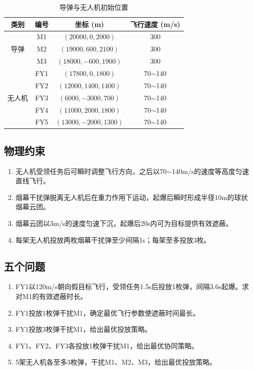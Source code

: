 \documentclass[12pt,a4paper]{ctexart}
\begin{document}
\begin{table}[H]
\centering
\caption{导弹与无人机初始位置}
\label{tab:initial_positions}
\begin{tabular}{c|c|c|c}
\toprule
\textbf{类别} & \textbf{编号} & \textbf{坐标 (m)} & \textbf{飞行速度 (m/s)} \\
\midrule
\multirow{3}{*}{导弹} & M1 & $(20000, 0, 2000)$ & 300 \\
& M2 & $(19000, 600, 2100)$ & 300 \\
& M3 & $(18000, -600, 1900)$ & 300 \\
\midrule
\multirow{5}{*}{无人机} & FY1 & $(17800, 0, 1800)$ & 70$\sim$140 \\
& FY2 & $(12000, 1400, 1400)$ & 70$\sim$140 \\
& FY3 & $(6000, -3000, 700)$ & 70$\sim$140 \\
& FY4 & $(11000, 2000, 1800)$ & 70$\sim$140 \\
& FY5 & $(13000, -2000, 1300)$ & 70$\sim$140 \\
\bottomrule
\end{tabular}
\end{table}

\subsection{物理约束}
\begin{enumerate}[label=(\arabic*)]
    \item 无人机受领任务后可瞬时调整飞行方向，之后以70$\sim$140m/s的速度等高度匀速直线飞行。
    \item 烟幕干扰弹脱离无人机后在重力作用下运动，起爆后瞬时形成半径10m的球状烟幕云团。
    \item 烟幕云团以3m/s的速度匀速下沉，起爆后20s内可为目标提供有效遮蔽。
    \item 每架无人机投放两枚烟幕干扰弹至少间隔1s；每架至多投放3枚。
\end{enumerate}

\subsection{五个问题}
\begin{enumerate}[label=\textbf{问题\arabic*}：, leftmargin=*]
    \item FY1以120m/s朝向假目标飞行，受领任务1.5s后投放1枚弹，间隔3.6s起爆。求对M1的有效遮蔽时长。
    \item FY1投放1枚弹干扰M1，确定最优飞行参数使遮蔽时间最长。
    \item FY1投放3枚弹干扰M1，给出最优投放策略。
    \item FY1、FY2、FY3各投放1枚弹干扰M1，给出最优协同策略。
    \item 5架无人机各至多3枚弹，干扰M1、M2、M3，给出最优投放策略。
\end{enumerate}
\end{document}
